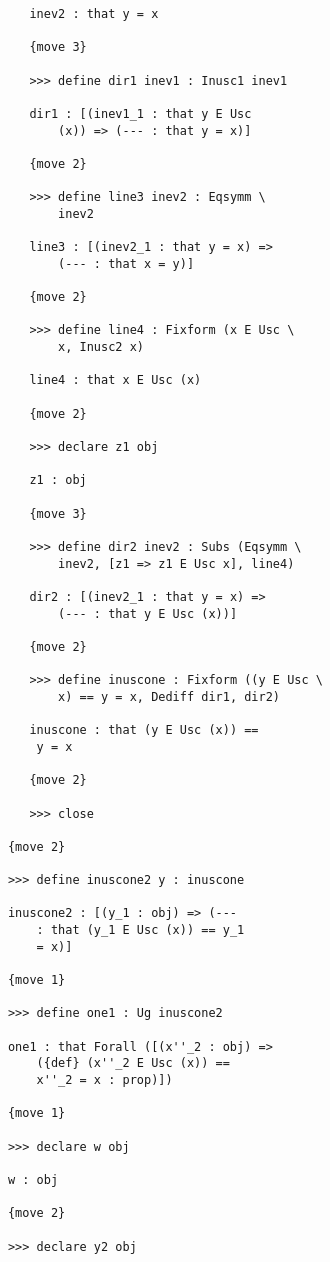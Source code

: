 \documentclass[12pt]{article}
\begin{document}
\begin{verbatim}
         inev2 : that y = x

         {move 3}

         >>> define dir1 inev1 : Inusc1 inev1

         dir1 : [(inev1_1 : that y E Usc 
             (x)) => (--- : that y = x)]

         {move 2}

         >>> define line3 inev2 : Eqsymm \
             inev2

         line3 : [(inev2_1 : that y = x) => 
             (--- : that x = y)]

         {move 2}

         >>> define line4 : Fixform (x E Usc \
             x, Inusc2 x)

         line4 : that x E Usc (x)

         {move 2}

         >>> declare z1 obj

         z1 : obj

         {move 3}

         >>> define dir2 inev2 : Subs (Eqsymm \
             inev2, [z1 => z1 E Usc x], line4)

         dir2 : [(inev2_1 : that y = x) => 
             (--- : that y E Usc (x))]

         {move 2}

         >>> define inuscone : Fixform ((y E Usc \
             x) == y = x, Dediff dir1, dir2)

         inuscone : that (y E Usc (x)) == 
          y = x

         {move 2}

         >>> close

      {move 2}

      >>> define inuscone2 y : inuscone

      inuscone2 : [(y_1 : obj) => (--- 
          : that (y_1 E Usc (x)) == y_1 
          = x)]

      {move 1}

      >>> define one1 : Ug inuscone2

      one1 : that Forall ([(x''_2 : obj) => 
          ({def} (x''_2 E Usc (x)) == 
          x''_2 = x : prop)])

      {move 1}

      >>> declare w obj

      w : obj

      {move 2}

      >>> declare y2 obj


\end{verbatim}
\end{document}
